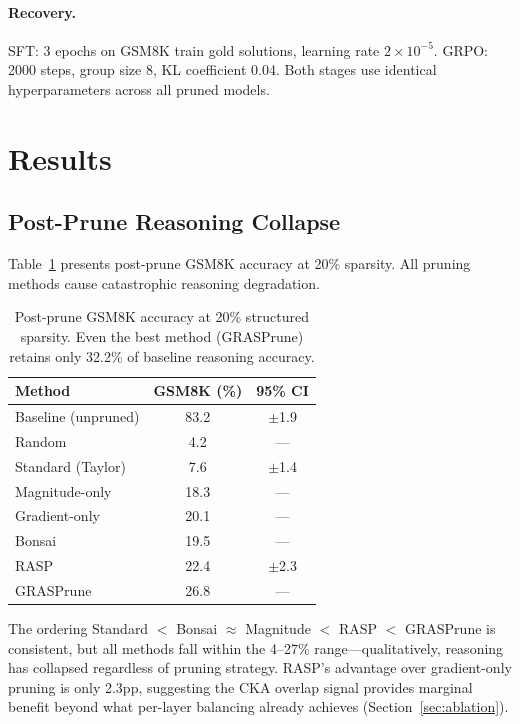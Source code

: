 \documentclass[11pt,a4paper]{article}
\begin{document}
\paragraph{Recovery.}
SFT: 3 epochs on GSM8K train gold solutions, learning rate $2\times10^{-5}$.
GRPO: 2000 steps, group size 8, KL coefficient 0.04.
Both stages use identical hyperparameters across all pruned models.

\section{Results}
\label{sec:results}

\subsection{Post-Prune Reasoning Collapse}
\label{sec:postprune}

Table~\ref{tab:postprune} presents post-prune GSM8K accuracy at 20\% sparsity.
All pruning methods cause catastrophic reasoning degradation.

\begin{table}[t]
\centering
\small
\begin{tabular}{lcc}
\toprule
\textbf{Method} & \textbf{GSM8K (\%)} & \textbf{95\% CI} \\
\midrule
Baseline (unpruned) & 83.2 & $\pm$1.9 \\
\midrule
Random & 4.2 & --- \\
Standard (Taylor) & 7.6 & $\pm$1.4 \\
Magnitude-only & 18.3 & --- \\
Gradient-only & 20.1 & --- \\
Bonsai & 19.5 & --- \\
RASP & 22.4 & $\pm$2.3 \\
GRASPrune & 26.8 & --- \\
\bottomrule
\end{tabular}
\caption{Post-prune GSM8K accuracy at 20\% structured sparsity. Even the best method (GRASPrune) retains only 32.2\% of baseline reasoning accuracy.}
\label{tab:postprune}
\end{table}

The ordering Standard $<$ Bonsai $\approx$ Magnitude $<$ RASP $<$ GRASPrune is consistent, but all methods fall within the 4--27\% range---qualitatively, reasoning has collapsed regardless of pruning strategy.
RASP's advantage over gradient-only pruning is only 2.3pp, suggesting the CKA overlap signal provides marginal benefit beyond what per-layer balancing already achieves (Section~\ref{sec:ablation}).
\end{document}
